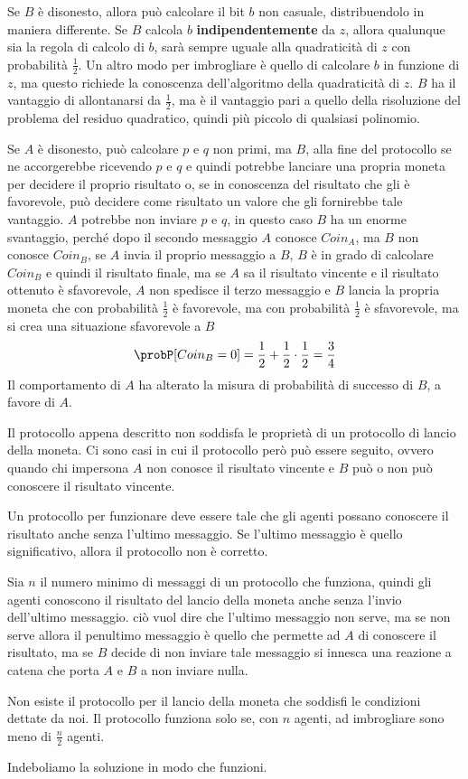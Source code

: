 Se $B$ è disonesto, allora può calcolare il bit $b$ non casuale, distribuendolo
in maniera differente. Se $B$ calcola $b$ \textbf{indipendentemente} da 
$z$, allora qualunque sia la regola di calcolo di $b$, sarà sempre 
uguale alla quadraticità di $z$ con probabilità $\frac{1}{2}$. Un altro modo 
per imbrogliare è quello di calcolare $b$ in funzione di $z$, ma 
questo richiede la conoscenza dell'algoritmo della quadraticità di $z$.
$B$ ha il vantaggio di allontanarsi da $\frac{1}{2}$, ma è il vantaggio 
pari a quello della risoluzione del problema del residuo quadratico, quindi 
più piccolo di qualsiasi polinomio.

Se $A$ è disonesto, può calcolare $p$ e $q$ non primi, ma $B$, alla fine del 
protocollo se ne accorgerebbe ricevendo $p$ e $q$ e quindi potrebbe
lanciare una propria moneta per decidere il proprio risultato o, se in conoscenza 
del risultato che gli è favorevole, può decidere come risultato un valore che gli 
fornirebbe tale vantaggio. 
$A$ potrebbe non inviare $p$ e $q$, in questo caso $B$ ha un enorme 
svantaggio, perché dopo il secondo messaggio $A$ conosce $Coin_A$, ma 
$B$ non conosce $Coin_B$, se $A$ invia il proprio messaggio a $B$, $B$ 
è in grado di calcolare $Coin_B$ e quindi il risultato finale, ma se $A$
sa il risultato vincente e il risultato ottenuto è sfavorevole, $A$ non 
spedisce il terzo messaggio e $B$ lancia la propria moneta che con probabilità 
$\frac{1}{2}$ è favorevole, ma con probabilità $\frac{1}{2}$ è sfavorevole,
ma si crea una situazione sfavorevole a $B$
\[
  \probP[Coin_B = 0] = \frac{1}{2} + \frac{1}{2} \cdot \frac{1}{2} = \frac{3}{4}
\]
Il comportamento di $A$ ha alterato la misura di probabilità di successo di $B$, a 
favore di $A$.

Il protocollo appena descritto non soddisfa le proprietà di un protocollo di lancio della 
moneta. Ci sono casi in cui il protocollo però può essere seguito, ovvero quando chi 
impersona $A$ non conosce il risultato vincente e $B$ può o non può conoscere il risultato 
vincente.
\begin{tcolorbox}
  Un protocollo per funzionare deve essere tale che gli agenti possano conoscere il 
  risultato anche senza l'ultimo messaggio. Se l'ultimo messaggio è quello significativo,
  allora il protocollo non è corretto.
\end{tcolorbox}
Sia $n$ il numero minimo di messaggi di un protocollo che funziona, quindi gli agenti conoscono 
il risultato del lancio della moneta anche senza l'invio dell'ultimo messaggio.
ciò vuol dire che l'ultimo messaggio non serve, ma se non serve allora il penultimo 
messaggio è quello che permette ad $A$ di conoscere il risultato, ma se $B$ decide di non 
inviare tale messaggio si innesca una reazione a catena che porta $A$ e $B$ a non inviare nulla.
\begin{tcolorbox}
Non esiste il protocollo per il lancio della moneta che soddisfi le condizioni dettate da noi.
Il protocollo funziona solo se, con $n$ agenti, ad imbrogliare sono meno di $\frac{n}{2}$ agenti.
\end{tcolorbox}
Indeboliamo la soluzione in modo che funzioni.
